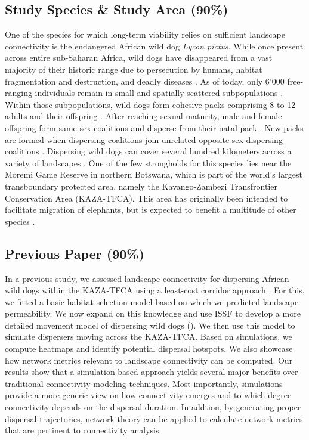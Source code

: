 \documentclass[abstract=on,10pt,a4paper,bibliography=totocnumbered]{article}
\begin{document}
\subsection{Study Species \& Study Area (90\%)}
One of the species for which long-term viability relies on sufficient landscape
connectivity is the endangered African wild dog \textit{Lycon pictus}. While
once present across entire sub-Saharan Africa, wild dogs have disappeared from a
vast majority of their historic range due to persecution by humans, habitat
fragmentation and destruction, and deadly diseases \citep{Woodroffe.2012,
Woodroffe.2020}. As of today, only 6'000 free-ranging individuals remain in
small and spatially scattered subpopulations \citep{Woodroffe.2012}. Within
those subpopulations, wild dogs form cohesive packs comprising 8 to 12 adults
and their offspring \cite{McNutt.1995}. After reaching sexual maturity, male and
female offspring form same-sex coalitions and disperse from their natal pack
\citep{McNutt.1996, Behr.2020}. New packs are formed when dispersing coalitions
join unrelated opposite-sex dispersing coalitions \citep{McNutt.1996}.
Dispersing wild dogs can cover several hundred kilometers across a variety of
landscapes \citep{DaviesMostert.2012, Masenga.2016, Cozzi.2020, Hofmann.2021}.
One of the few strongholds for this species lies near the Moremi Game Reserve in
northern Botswana, which is part of the world's largest transboundary protected
area, namely the Kavango-Zambezi Transfrontier Conservation Area (KAZA-TFCA).
This area has originally been intended to facilitate migration of elephants, but
is expected to benefit a multitude of other species \citep{Elliot.2014,
Brennan.2020, Hofmann.2021}.

\subsection{Previous Paper (90\%)}
In a previous study, we assessed landscape connectivity for dispersing African
wild dogs within the KAZA-TFCA using a least-cost corridor approach
\citep{Hofmann.2021}. For this, we fitted a basic habitat selection model based
on which we predicted landscape permeability. We now expand on this knowledge
and use ISSF to develop a more detailed movement model of dispersing wild dogs
(). We then use this model to simulate dispersers moving
across the KAZA-TFCA. Based on simulations, we compute heatmaps and identify
potential dispersal hotspots. We also showcase how network metrics relevant to
landscape connectivity can be computed. Our results show that a simulation-based
approach yields several major benefits over traditional connectivity modeling
techniques. Most importantly, simulations provide a more generic view on how
connectivity emerges and to which degree connectivity depends on the dispersal
duration. In addtion, by generating proper dispersal trajectories, network
theory can be applied to calculate network metrics that are pertinent to
connectivity analysis.
\end{document}
